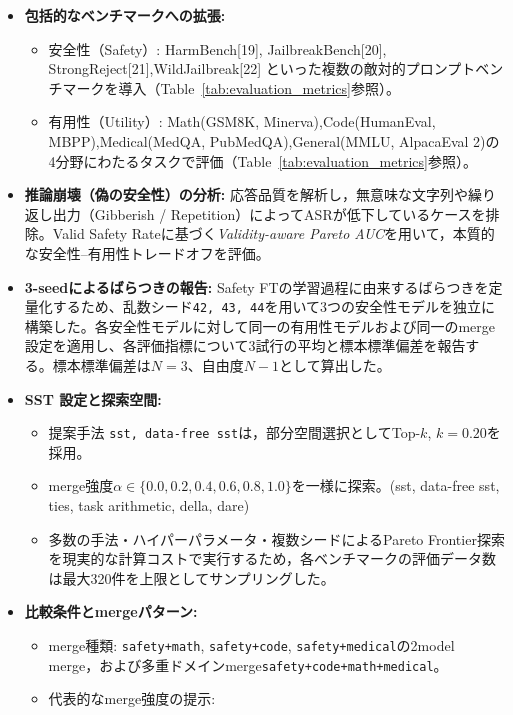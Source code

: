\documentclass{article}
\begin{document}
\begin{itemize}
    \item \textbf{包括的なベンチマークへの拡張:}
    \begin{itemize}
        \item 安全性（Safety）:
        HarmBench[19], JailbreakBench[20], StrongReject[21],WildJailbreak[22] といった複数の敵対的プロンプトベンチマークを導入（Table~\ref{tab:evaluation_metrics}参照）。
        \item 有用性（Utility）:
        Math(GSM8K, Minerva),Code(HumanEval, MBPP),Medical(MedQA, PubMedQA),General(MMLU, AlpacaEval 2)の4分野にわたるタスクで評価（Table~\ref{tab:evaluation_metrics}参照）。
    \end{itemize}
    \item \textbf{推論崩壊（偽の安全性）の分析:}
    応答品質を解析し，無意味な文字列や繰り返し出力（Gibberish / Repetition）によってASRが低下しているケースを排除。Valid Safety Rateに基づく\textit{Validity-aware Pareto AUC}を用いて，本質的な安全性--有用性トレードオフを評価。
    \item \textbf{3-seedによるばらつきの報告:}
    Safety FTの学習過程に由来するばらつきを定量化するため、乱数シード\texttt{42, 43, 44}を用いて3つの安全性モデルを独立に構築した。各安全性モデルに対して同一の有用性モデルおよび同一のmerge設定を適用し、各評価指標について3試行の平均と標本標準偏差を報告する。標本標準偏差は\(N=3\)、自由度\(N-1\)として算出した。
    \item \textbf{SST 設定と探索空間:}
    \begin{itemize}
        \item 提案手法 \texttt{sst, data-free sst}は，部分空間選択としてTop-$k$, $k=0.20$を採用。
        \item merge強度$\alpha \in \{0.0, 0.2, 0.4, 0.6, 0.8, 1.0\}$を一様に探索。(sst, data-free sst, ties, task arithmetic, della, dare)
        \item 多数の手法・ハイパーパラメータ・複数シードによるPareto Frontier探索を現実的な計算コストで実行するため，各ベンチマークの評価データ数は最大320件を上限としてサンプリングした。
    \end{itemize}
    \item \textbf{比較条件とmergeパターン:}
    \begin{itemize}
        \item merge種類:
        \texttt{safety+math},
        \texttt{safety+code},
        \texttt{safety+medical}の2model merge，および多重ドメインmerge\texttt{safety+code+math+medical}。
        \item 代表的なmerge強度の提示:

\end{itemize}
\end{itemize}
\end{document}
